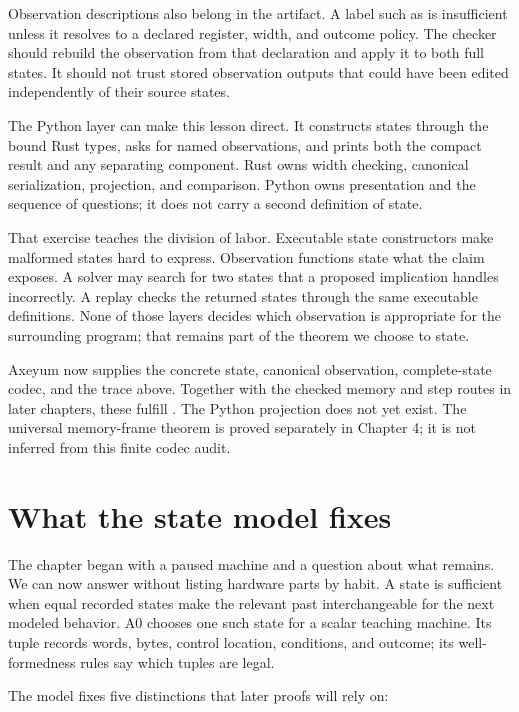 Observation descriptions also belong in the artifact. A label such as
 is insufficient unless it resolves to a declared register,
width, and outcome policy. The checker should rebuild the observation from
that declaration and apply it to both full states. It should not trust stored
observation outputs that could have been edited independently of their source
states.

The Python layer can make this lesson direct. It constructs states through
the bound Rust types, asks for named observations, and prints both the compact
result and any separating component. Rust owns width checking, canonical
serialization, projection, and comparison. Python owns presentation and the
sequence of questions; it does not carry a second definition of state.

That exercise teaches the division of labor. Executable state constructors
make malformed states hard to express. Observation functions state what the
claim exposes. A solver may search for two states that a proposed implication
handles incorrectly. A replay checks the returned states through the same
executable definitions. None of those layers decides which observation is
appropriate for the surrounding program; that remains part of the theorem we
choose to state.

Axeyum now supplies the concrete state, canonical observation, complete-state
codec, and the trace above. Together with the checked memory and step routes in
later chapters, these fulfill . The Python projection
does not yet exist. The universal memory-frame theorem is proved separately in
Chapter 4; it is not inferred from this finite codec audit.

\section{What the state model fixes}

The chapter began with a paused machine and a question about what remains. We
can now answer without listing hardware parts by habit. A state is sufficient
when equal recorded states make the relevant past interchangeable for the
next modeled behavior. A0 chooses one such state for a scalar teaching
machine. Its tuple records words, bytes, control location, conditions, and
outcome; its well-formedness rules say which tuples are legal.

The model fixes five distinctions that later proofs will rely on:

